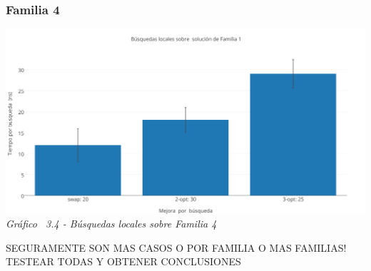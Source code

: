 \subsubsection*{Familia 4}

\vspace*{0.3cm} \vspace*{0.3cm}
  \begin{center}
 \includegraphics[scale=0.5]{./EJ3/local_search_familia.png}
 {            \textit{Gráfico \ 3.4 - Búsquedas locales sobre Familia 4}}
  \end{center}
  \vspace*{0.3cm}
  
SEGURAMENTE SON MAS CASOS O POR FAMILIA O MAS FAMILIAS! TESTEAR TODAS Y OBTENER CONCLUSIONES
